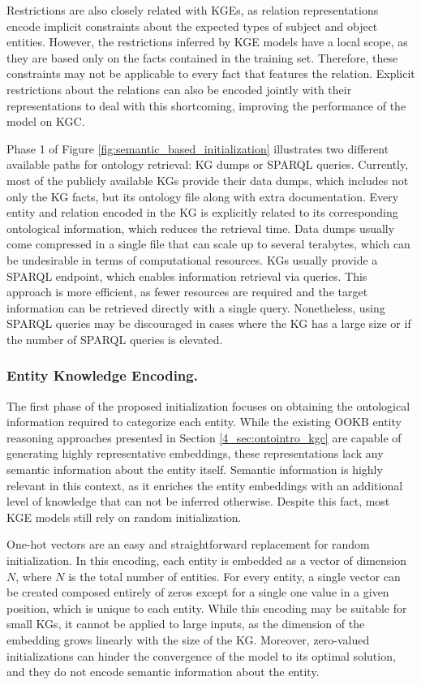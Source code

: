 Restrictions are also closely related with KGEs, as relation representations encode implicit constraints about the expected types of subject and object entities. However, the restrictions inferred by KGE models have a local scope, as they are based only on the facts contained in the training set. Therefore, these constraints may not be applicable to every fact that features the relation. Explicit restrictions about the relations can also be encoded jointly with their representations to deal with this shortcoming, improving the performance of the model on KGC.

Phase 1 of Figure \ref{fig:semantic_based_initialization} illustrates two different available paths for ontology retrieval: KG dumps or SPARQL queries. Currently, most of the publicly available KGs provide their data dumps, which includes not only the KG facts, but its ontology file along with extra documentation. Every entity and relation encoded in the KG is explicitly related to its corresponding ontological information, which reduces the retrieval time. Data dumps usually come compressed in a single file that can scale up to several terabytes, which can be undesirable in terms of computational resources. KGs usually provide a SPARQL endpoint, which enables information retrieval via queries. This approach is more efficient, as fewer resources are required and the target information can be retrieved directly with a single query. Nonetheless, using SPARQL queries may be discouraged in cases where the KG has a large size or if the number of SPARQL queries is elevated. 

\subsubsection{Entity Knowledge Encoding.}\label{subsec:s4_entity_encode}
The first phase of the proposed initialization focuses on obtaining the ontological information required to categorize each entity. While the existing OOKB entity reasoning approaches presented in Section \ref{4_sec:ontointro_kgc} are capable of generating highly representative embeddings, these representations lack any semantic information about the entity itself. Semantic information is highly relevant in this context, as it enriches the entity embeddings with an additional level of knowledge that can not be inferred otherwise. Despite this fact, most KGE models still rely on random initialization. 

One-hot vectors are an easy and straightforward replacement for random initialization. In this encoding, each entity is embedded as a vector of dimension $N$, where $N$ is the total number of entities. For every entity, a single vector can be created composed entirely of zeros except for a single one value in a given position, which is unique to each entity. While this encoding may be suitable for small KGs, it cannot be applied to large inputs, as the dimension of the embedding grows linearly with the size of the KG. Moreover, zero-valued initializations can hinder the convergence of the model to its optimal solution, and they do not encode semantic information about the entity.


